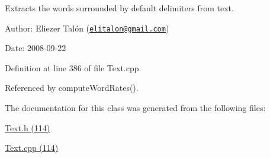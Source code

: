 Extracts the words surrounded by default delimiters from text. 

\begin{Desc}
\item[Author:]Eliezer Talón (\href{mailto:elitalon@gmail.com}{\tt elitalon@gmail.com}) \end{Desc}
\begin{Desc}
\item[Date:]2008-09-22 \end{Desc}


Definition at line 386 of file Text.cpp.

Referenced by computeWordRates().

The documentation for this class was generated from the following files:\begin{CompactItemize}
\item 
\hyperlink{_text_8h}{Text.h (114)}\item 
\hyperlink{_text_8cpp}{Text.cpp (114)}\end{CompactItemize}
